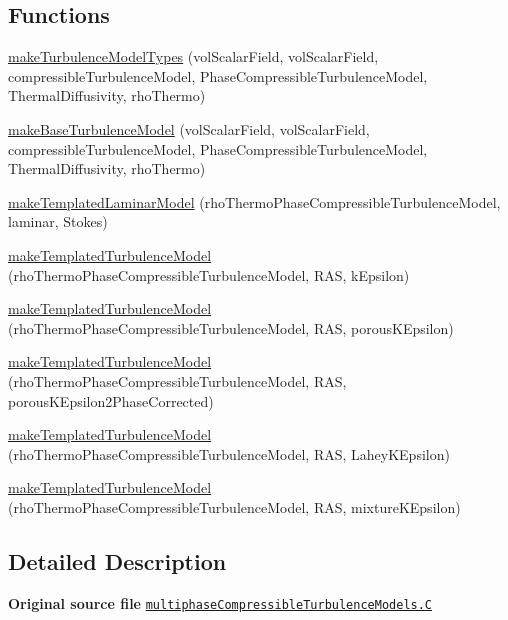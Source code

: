 \subsection*{Functions}
\begin{DoxyCompactItemize}
\item 
\hyperlink{multiphaseCompressibleTurbulenceModels_8C_af870ea713204ad3d78e94706815d4c44}{make\+Turbulence\+Model\+Types} (vol\+Scalar\+Field, vol\+Scalar\+Field, compressible\+Turbulence\+Model, Phase\+Compressible\+Turbulence\+Model, Thermal\+Diffusivity, rho\+Thermo)
\item 
\hyperlink{multiphaseCompressibleTurbulenceModels_8C_a6dacff1f606adb2cd5c61df568d17b44}{make\+Base\+Turbulence\+Model} (vol\+Scalar\+Field, vol\+Scalar\+Field, compressible\+Turbulence\+Model, Phase\+Compressible\+Turbulence\+Model, Thermal\+Diffusivity, rho\+Thermo)
\item 
\hyperlink{multiphaseCompressibleTurbulenceModels_8C_a7a8dc5e6787918955678dbcffc14e9cd}{make\+Templated\+Laminar\+Model} (rho\+Thermo\+Phase\+Compressible\+Turbulence\+Model, laminar, Stokes)
\item 
\hyperlink{multiphaseCompressibleTurbulenceModels_8C_a31356fdc4a477f59da9ad0a6e70e481e}{make\+Templated\+Turbulence\+Model} (rho\+Thermo\+Phase\+Compressible\+Turbulence\+Model, R\+AS, k\+Epsilon)
\item 
\hyperlink{multiphaseCompressibleTurbulenceModels_8C_a08c1ddf7e60c4f12ea6b772221f4afe5}{make\+Templated\+Turbulence\+Model} (rho\+Thermo\+Phase\+Compressible\+Turbulence\+Model, R\+AS, porous\+K\+Epsilon)
\item 
\hyperlink{multiphaseCompressibleTurbulenceModels_8C_a029de6c224e1ee2398732cef70db57d8}{make\+Templated\+Turbulence\+Model} (rho\+Thermo\+Phase\+Compressible\+Turbulence\+Model, R\+AS, porous\+K\+Epsilon2\+Phase\+Corrected)
\item 
\hyperlink{multiphaseCompressibleTurbulenceModels_8C_ad878dbb9112236936353b91c13e4353b}{make\+Templated\+Turbulence\+Model} (rho\+Thermo\+Phase\+Compressible\+Turbulence\+Model, R\+AS, Lahey\+K\+Epsilon)
\item 
\hyperlink{multiphaseCompressibleTurbulenceModels_8C_a18939dd2bd1b1958d1c1412c286688a5}{make\+Templated\+Turbulence\+Model} (rho\+Thermo\+Phase\+Compressible\+Turbulence\+Model, R\+AS, mixture\+K\+Epsilon)
\end{DoxyCompactItemize}


\subsection{Detailed Description}
{\bfseries Original source file} \href{../../../home/carlo/data/GeN-Foam/GeN-Foam_ffn/GeN-Foam/GeN-Foam/classes/thermalHydraulics/src/physicsModels/turbulenceModels/multiphaseCompressibleTurbulenceModels.C}{\tt multiphase\+Compressible\+Turbulence\+Models.\+C} 

